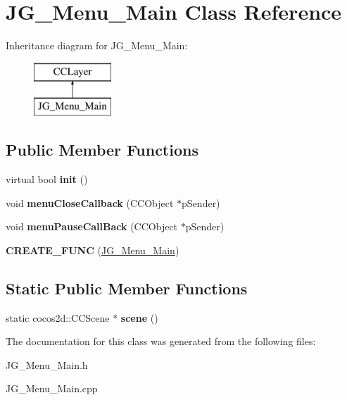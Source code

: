 \hypertarget{class_j_g___menu___main}{\section{J\-G\-\_\-\-Menu\-\_\-\-Main Class Reference}
\label{class_j_g___menu___main}
}
Inheritance diagram for J\-G\-\_\-\-Menu\-\_\-\-Main\-:\begin{figure}[H]
\begin{center}
\leavevmode
\includegraphics[height=2.000000cm]{class_j_g___menu___main}
\end{center}
\end{figure}
\subsection*{Public Member Functions}
\begin{DoxyCompactItemize}
\item 
\hypertarget{class_j_g___menu___main_ae015e299e7fd365043d747c6198cd418}{virtual bool {\bfseries init} ()}\label{class_j_g___menu___main_ae015e299e7fd365043d747c6198cd418}

\item 
\hypertarget{class_j_g___menu___main_aecbc239ff1644bff785af4e6a72dd516}{void {\bfseries menu\-Close\-Callback} (C\-C\-Object $\ast$p\-Sender)}\label{class_j_g___menu___main_aecbc239ff1644bff785af4e6a72dd516}

\item 
\hypertarget{class_j_g___menu___main_a606ffa5c67ae0d9451922ae2661583c8}{void {\bfseries menu\-Pause\-Call\-Back} (C\-C\-Object $\ast$p\-Sender)}\label{class_j_g___menu___main_a606ffa5c67ae0d9451922ae2661583c8}

\item 
\hypertarget{class_j_g___menu___main_a2abd1c8349ebb5469d4ea533abb69b51}{{\bfseries C\-R\-E\-A\-T\-E\-\_\-\-F\-U\-N\-C} (\hyperlink{class_j_g___menu___main}{J\-G\-\_\-\-Menu\-\_\-\-Main})}\label{class_j_g___menu___main_a2abd1c8349ebb5469d4ea533abb69b51}

\end{DoxyCompactItemize}
\subsection*{Static Public Member Functions}
\begin{DoxyCompactItemize}
\item 
\hypertarget{class_j_g___menu___main_a4725c05fccdb74b94d0b097e6310f743}{static cocos2d\-::\-C\-C\-Scene $\ast$ {\bfseries scene} ()}\label{class_j_g___menu___main_a4725c05fccdb74b94d0b097e6310f743}

\end{DoxyCompactItemize}


The documentation for this class was generated from the following files\-:\begin{DoxyCompactItemize}
\item 
J\-G\-\_\-\-Menu\-\_\-\-Main.\-h\item 
J\-G\-\_\-\-Menu\-\_\-\-Main.\-cpp\end{DoxyCompactItemize}
